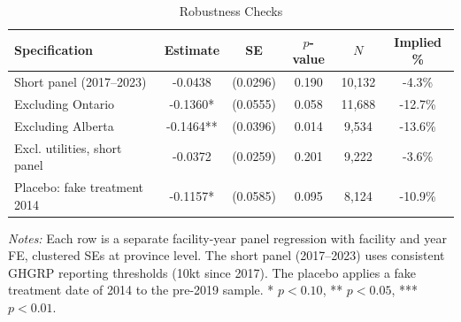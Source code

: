 \begin{table}[htbp]
\centering
\caption{Robustness Checks}
\label{tab:robust}
\begin{tabular}{lccccc}
\hline\hline
Specification & Estimate & SE & $p$-value & $N$ & Implied \% \\
\hline
Short panel (2017--2023) & -0.0438 & (0.0296) & 0.190 & 10,132 & -4.3\% \\
Excluding Ontario & -0.1360* & (0.0555) & 0.058 & 11,688 & -12.7\% \\
Excluding Alberta & -0.1464** & (0.0396) & 0.014 & 9,534 & -13.6\% \\
Excl. utilities, short panel & -0.0372 & (0.0259) & 0.201 & 9,222 & -3.6\% \\
Placebo: fake treatment 2014 & -0.1157* & (0.0585) & 0.095 & 8,124 & -10.9\% \\
\hline\hline
\end{tabular}
\begin{tablenotes}
\small
\item \textit{Notes:} Each row is a separate facility-year panel regression with facility and year FE, clustered SEs at province level. The short panel (2017--2023) uses consistent GHGRP reporting thresholds (10kt since 2017). The placebo applies a fake treatment date of 2014 to the pre-2019 sample. * $p<0.10$, ** $p<0.05$, *** $p<0.01$.
\end{tablenotes}
\end{table}
